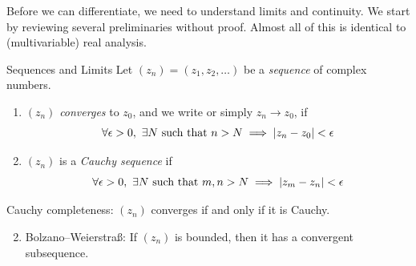 Before we can differentiate, we need to understand limits and continuity. We start by reviewing several preliminaries without proof. Almost all of this is identical to (multivariable) real analysis.

\begin{defn}{Sequences and Limits}{}{}
	Let $(z_n)=(z_1,z_2,\ldots)$ be a \emph{sequence} of complex numbers.
	\begin{enumerate}\itemsep2pt
	  \item $(z_n)$ \emph{converges} to $z_0$, and we write  or simply $z_n\to z_0$, if
		\[
			\forall \epsilon>0,\ \exists N\text{ such that }n>N\implies \left| z_n-z_0\right|<\epsilon
		\]
		
		\item $(z_n)$ is a \emph{Cauchy sequence} if
		\[
			\forall \epsilon>0,\ \exists N\text{ such that }m,n>N\implies \left| z_m-z_n\right|<\epsilon
		\]
	\end{enumerate}
\end{defn}

\begin{thm}{}{}
	\exstart Cauchy completeness: $(z_n)$ converges if and only if it is Cauchy.
	\begin{enumerate}\setcounter{enumi}{1}
	  \item Bolzano--Weierstraß: If $(z_n)$ is bounded, then it has a convergent subsequence.
	\end{enumerate}
\end{thm}

